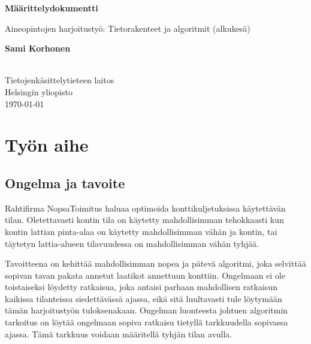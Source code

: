 \documentclass[a4paper,12pt, titlepage]{article}
\begin{document}
\begin{titlepage}
    \begin{center}
        \vspace*{1cm}
        
        \LARGE
        \textbf{Määrittelydokumentti}
        
        \vspace{0.5cm}
        \Large
        Aineopintojen harjoitustyö: Tietorakenteet ja algoritmit (alkukesä)
        
        \vspace{1.5cm}
        
        \large
        \textbf{Sami Korhonen} \\
         \\
        
		\vfill        
        \normalsize
        Tietojenkäsittelytieteen laitos\\
        Helsingin yliopisto\\
		\large        
        \today
        
    \end{center}
\end{titlepage}



\section*{Työn aihe}
\subsection*{Ongelma ja tavoite}
Rahtifirma NopsaToimitus haluaa optimoida konttikuljetuksissa käytettävän tilan. Oletettavasti kontin tila on käytetty mahdollisimman tehokkaasti kun kontin lattian pinta-alaa on käytetty mahdollisimman vähän ja kontin, tai täytetyn lattia-alueen tilavuudessa on mahdollisimman vähän tyhjää. \newline

\noindent
Tavoitteena on kehittää mahdollisimman nopea ja pätevä algoritmi, joka selvittää sopivan tavan pakata annetut laatikot annettuun konttiin. Ongelmaan ei ole toistaiseksi löydetty ratkaisua, joka antaisi parhaan mahdollisen ratkaisun kaikissa tilanteissa siedettävässä ajassa, eikä sitä luultavasti tule löytymään tämän harjoitustyön tuloksenakaan. Ongelman luonteesta johtuen algoritmin tarkoitus on löytää ongelmaan sopiva ratkaisu tietyllä tarkkuudella sopivassa ajassa. Tämä tarkkuus voidaan määritellä tyhjän tilan avulla.
\end{document}

